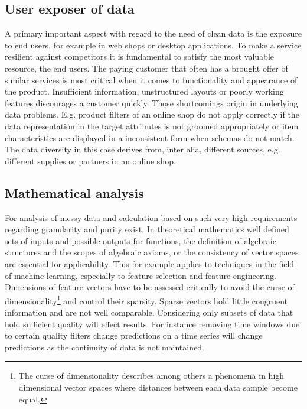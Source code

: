\subsection{User exposer of data}

A primary important aspect with regard to the need of clean data is the exposure to end users, for example in web shops or desktop applications\cite{kim_niehm_2009}. To make a service resilient against competitors it is fundamental to satisfy the most valuable resource, the end users. The paying customer that often has a brought offer of similar services is most critical when it comes to functionality and appearance of the product\cite{huitfeldt_middleton_2001}. Insufficient information, unstructured layouts or poorly working features discourages a customer quickly. Those shortcomings origin in underlying data problems. E.g. product filters of an online shop do not apply correctly if the data representation in the target attributes is not groomed appropriately or item characteristics are displayed in a inconsistent form when schemas do not match. The data diversity in this case derives from, inter alia, different sources, e.g. different supplies or partners in an online shop.

\subsection{Mathematical analysis} 

For analysis of messy data and calculation based on such 
very high requirements regarding granularity and purity exist. In theoretical mathematics well defined sets of inputs and possible outputs for functions, the definition of algebraic structures and the scopes of algebraic axioms, or the consistency of vector spaces are essential for applicability. This for example applies to techniques in the field of machine learning, especially to feature selection and feature engineering\cite{mitchell_1999}. Dimensions of feature vectors have to be assessed critically to avoid the curse of dimensionality\footnote{The curse of dimensionality describes among others a phenomena in high dimensional vector spaces where distances between each data sample become equal.} and control their sparsity. Sparse vectors hold little congruent information and are not well comparable. Considering only subsets of data that hold sufficient quality will effect results. For instance removing time windows due to certain quality filters change predictions on a time series will change predictions as the continuity of data is not maintained.

